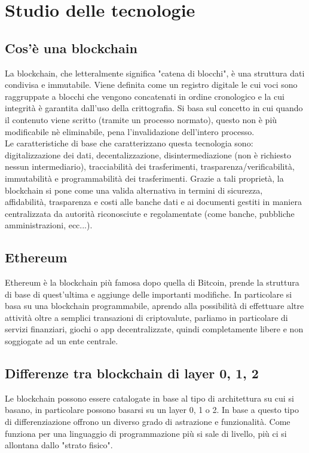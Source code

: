 \section{Studio delle tecnologie}

\subsection{Cos'è una blockchain}
La blockchain, che letteralmente significa "catena di blocchi", è una struttura dati condivisa e
immutabile. Viene definita come un registro digitale le cui voci sono raggruppate a blocchi che
vengono concatenati in ordine cronologico e la cui integrità è garantita dall'uso della crittografia.
Si basa sul concetto in cui quando il contenuto viene scritto (tramite un processo normato), questo non
è più modificabile nè eliminabile, pena l'invalidazione dell'intero processo.\\
Le caratteristiche di base che caratterizzano questa tecnologia sono: digitalizzazione dei dati, decentalizzazione,
disintermediazione (non è richiesto nessun intermediario), tracciabilità dei trasferimenti, trasparenza/verificabilità,
immutabilità e programmabilità dei trasferimenti. Grazie a tali proprietà, la blockchain si pone come una valida
alternativa in termini di sicurezza, affidabilità, trasparenza e costi alle banche dati e ai documenti gestiti in maniera
centralizzata da autorità riconosciute e regolamentate (come banche, pubbliche amministrazioni, ecc...).

\subsection{Ethereum}
Ethereum è la blockchain più famosa dopo quella di Bitcoin, prende la struttura di base di quest'ultima e aggiunge delle
importanti modifiche. In particolare si basa su una blockchain programmabile, aprendo alla possibilità di effettuare altre attività
oltre a semplici transazioni di criptovalute, parliamo in particolare di servizi finanziari, giochi o app decentralizzate, quindi
completamente libere e non soggiogate ad un ente centrale.

\subsection{Differenze tra blockchain di layer 0, 1, 2}
Le blockchain possono essere catalogate in base al tipo di architettura su cui si basano, in particolare possono basarsi su un layer 0, 1 o 2.
In base a questo tipo di differenziazione offrono un diverso grado di astrazione e funzionalità. Come funziona per una linguaggio di programmazione
più si sale di livello, più ci si allontana dallo "strato fisico".
    
